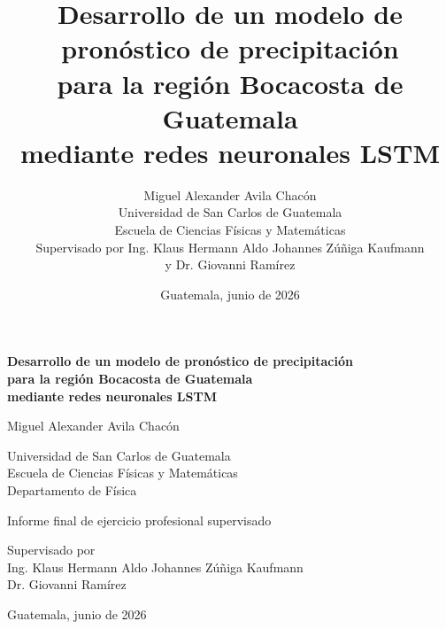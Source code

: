 \documentclass[11pt,letterpaper,oneside]{report}
\title{
  \LARGE\bfseries
  Desarrollo de un modelo de pronóstico de precipitación\\
  para la región Bocacosta de Guatemala\\
  mediante redes neuronales LSTM
}
\author{
  Miguel Alexander Avila Chacón\\[0.4em]
  \small Universidad de San Carlos de Guatemala\\
  \small Escuela de Ciencias Físicas y Matemáticas\\[0.4em]
  \small Supervisado por Ing. Klaus Hermann Aldo Johannes Zúñiga Kaufmann\\
  \small y Dr. Giovanni Ramírez
}
\date{\small Guatemala, junio de 2026}
\begin{document}
\begin{titlepage}
\thispagestyle{empty}

\vspace*{1.5cm}

\begin{center}

{\LARGE\bfseries
Desarrollo de un modelo de pronóstico de precipitación\\
para la región Bocacosta de Guatemala\\
mediante redes neuronales LSTM
\par}

\vspace{1.5cm}

{\large Miguel Alexander Avila Chacón\par}

\vspace{0.5cm}

{\small
Universidad de San Carlos de Guatemala\\
Escuela de Ciencias Físicas y Matemáticas\\
Departamento de Física
\par}

\vspace{0.5cm}

{\small
Informe final de ejercicio profesional supervisado
\par}

\vspace{0.5cm}

{\small
Supervisado por\\
Ing. Klaus Hermann Aldo Johannes Zúñiga Kaufmann\\
Dr. Giovanni Ramírez
\par}

\vspace{1.5cm}

{\small Guatemala, junio de 2026\par}

\end{center}

\vfill

\newpage


\end{titlepage}
\end{document}
